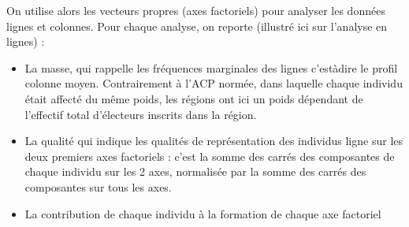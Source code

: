 \documentclass[letterpaper,10pt,french]{sphinxmanual}
\begin{document}
\sphinxAtStartPar
{} 

\sphinxAtStartPar
On utilise alors les vecteurs propres (axes factoriels) pour analyser les données lignes et colonnes. Pour chaque analyse, on reporte (illustré ici sur l’analyse en lignes) :
\begin{itemize}
\item {} 
\sphinxAtStartPar
La masse, qui rappelle les fréquences marginales des lignes c’est\sphinxhyphen{}à\sphinxhyphen{}dire le profil colonne moyen. Contrairement à l’ACP normée, dans laquelle chaque individu était affecté du même poids, les régions ont ici un poids dépendant de l’effectif total d’électeurs inscrits dans la région.

\item {} 
\sphinxAtStartPar
La qualité qui indique les qualités de représentation des individus ligne sur les deux premiers axes factoriels : c’est la somme des carrés des composantes de chaque individu sur les 2 axes, normalisée par la somme des carrés des composantes sur tous les axes.

\item {} 
\sphinxAtStartPar
La contribution de chaque individu à la formation de chaque axe factoriel

\end{itemize}
\end{document}
